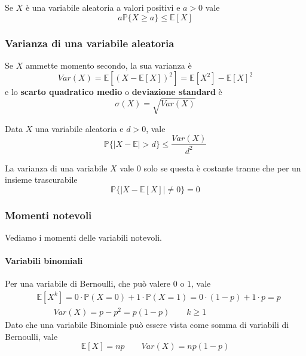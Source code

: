 \begin{proposition}
	Se $X$ è una variabile aleatoria a valori positivi e $a>0$ vale
	\begin{equation}
		a\mathbb{P}\{X \geq a\} \leq \mathbb{E}[X]
	\end{equation}
\end{proposition}

\subsubsection{Varianza di una variabile aleatoria}
\begin{definition} [Varianza]
	Se $X$ ammette momento secondo, la sua varianza è
	\begin{equation}
		Var(X) = \mathbb{E}[(X-\mathbb{E}[X])^2] = \mathbb{E}[X^2]-\mathbb{E}[X]^2
	\end{equation}
	e lo \textbf{scarto quadratico medio} o \textbf{deviazione standard} è
	\begin{equation}
		\sigma(X) = \sqrt{Var(X)}
	\end{equation}
\end{definition}

\begin{proposition}
	Data $X$ una variabile aleatoria e $d>0$, vale
	\begin{equation}
		\mathbb{P}\{\lvert X - \mathbb{E}\rvert > d\} \leq \frac{Var(X)}{d^2}
	\end{equation}
\end{proposition}

\begin{observation}
	La varianza di una variabile $X$ vale $0$ solo se questa è costante tranne che per un insieme trascurabile
	\begin{equation*}
		\mathbb{P}\{\lvert X - \mathbb{E}[X] \rvert \neq 0\} = 0
	\end{equation*}
\end{observation}

\subsubsection{Momenti notevoli}
Vediamo i momenti delle variabili notevoli.
\paragraph{Variabili binomiali}
Per una variabile di Bernoulli, che può valere $0$ o $1$, vale
\begin{align}
	& \mathbb{E}[X^k] = 0 \cdot \mathbb{P}(X=0)+1\cdot \mathbb{P}(X=1) = 0 \cdot (1-p) + 1 \cdot p = p \\
	&\quad\quad Var(X)=p-p^2=p(1-p) \quad\quad k \geq 1
\end{align}
Dato che una variabile Binomiale può essere vista come somma di variabili di Bernoulli, vale
\begin{equation}
	\mathbb{E}[X] = np \quad\quad Var(X) = np(1-p)
\end{equation}

